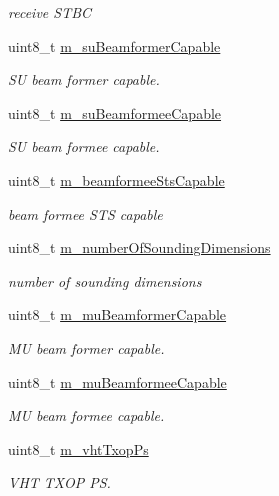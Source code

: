 \begin{DoxyCompactItemize}
\begin{DoxyCompactList}\small\item\em receive S\+T\+BC \end{DoxyCompactList}\item 
uint8\+\_\+t \hyperlink{classns3_1_1VhtCapabilities_a6c6a15832cd47a4c9e48f93edad69b27}{m\+\_\+su\+Beamformer\+Capable}
\begin{DoxyCompactList}\small\item\em SU beam former capable. \end{DoxyCompactList}\item 
uint8\+\_\+t \hyperlink{classns3_1_1VhtCapabilities_aabc73c23623e50a9dba2dfaadf31befa}{m\+\_\+su\+Beamformee\+Capable}
\begin{DoxyCompactList}\small\item\em SU beam formee capable. \end{DoxyCompactList}\item 
uint8\+\_\+t \hyperlink{classns3_1_1VhtCapabilities_aaecf70161e31da3bd6bda12f92bf3ac9}{m\+\_\+beamformee\+Sts\+Capable}
\begin{DoxyCompactList}\small\item\em beam formee S\+TS capable \end{DoxyCompactList}\item 
uint8\+\_\+t \hyperlink{classns3_1_1VhtCapabilities_adc25185f388e5c4ee9ea95e226d2d19d}{m\+\_\+number\+Of\+Sounding\+Dimensions}
\begin{DoxyCompactList}\small\item\em number of sounding dimensions \end{DoxyCompactList}\item 
uint8\+\_\+t \hyperlink{classns3_1_1VhtCapabilities_a436c61de355e9140334b068c001cabde}{m\+\_\+mu\+Beamformer\+Capable}
\begin{DoxyCompactList}\small\item\em MU beam former capable. \end{DoxyCompactList}\item 
uint8\+\_\+t \hyperlink{classns3_1_1VhtCapabilities_a4ad315b53baa57cf62dccd0505107f36}{m\+\_\+mu\+Beamformee\+Capable}
\begin{DoxyCompactList}\small\item\em MU beam formee capable. \end{DoxyCompactList}\item 
uint8\+\_\+t \hyperlink{classns3_1_1VhtCapabilities_a65e925626af356b9b272e673921ca919}{m\+\_\+vht\+Txop\+Ps}
\begin{DoxyCompactList}\small\item\em V\+HT T\+X\+OP PS. \end{DoxyCompactList}\item 

\end{DoxyCompactItemize}
